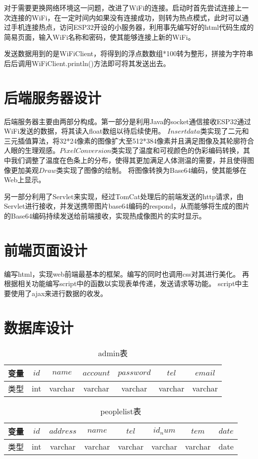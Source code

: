 对于需要更换网络环境这一问题，改进了WiFi的连接。启动时首先尝试连接上一次连接的WiFi，在一定时间内如果没有连接成功，则转为热点模式，此时可以通过手机连接热点，访问ESP32开设的小服务器，利用事先编写好的html代码生成的简易页面，输入WiFi名称和密码，使其能够连接上新的WiFi。

发送数据用到的是WiFiClient，将得到的浮点数数组*100转为整形，拼接为字符串后后调用WiFiClient.println()方法即可将其发送出去。
\section{后端服务器设计}
后端服务器主要由两部分构成。第一部分是利用Java的socket通信接收ESP32通过WiFi发送的数据，将其读入float数组以待后续使用。
$Insertdata$类实现了二元和三元插值算法，将32*24像素的图像扩大至512*384像素并且满足图像及其轮廓符合人眼的生理观感。$PixelConversion$类实现了温度和可视颜色的伪彩编码转换，其中我们调整了温度在色条上的分布，使得其更加满足人体测温的需要，并且使得图像更加美观$Draw$类实现了图像的绘制。
将图像转换为Base64编码，使其能够在Web上显示。

另一部分利用了Servlet来实现，经过TomCat处理后的前端发送的http请求，由Servlet进行接收，并发送携带图片base64编码的respond，从而能够将生成的图片的Base64编码持续发送给前端接收，实现热成像图片的实时显示。
\section{前端页面设计}
编写html，实现web前端最基本的框架。编写的同时也调用css对其进行美化。
再根据相关功能编写script中的函数以实现表单传递，发送请求等功能。
script中主要使用了ajax来进行数据的收发。
\section{数据库设计}
\begin{table}[htbp]
    \caption{admin表}\label{tab:table1}
    \vspace{0.5em}\centering\wuhao
    \begin{tabular}{ccccccc}
    \toprule[1.5pt]
    变量 & $id$ & $name$ & $account$&$password$ &$tel$&$email$\\
    \midrule[1pt]
    类型& int & varchar & varchar&varchar&varchar&varchar\\
    \bottomrule[1.5pt]
    \end{tabular}
    \vspace{\baselineskip}
    \end{table}
    
    \begin{table}[htbp]
        \caption{peoplelist表}\label{tab:table2}
        \vspace{0.5em}\centering\wuhao
        \begin{tabular}{cccccccc}
        \toprule[1.5pt]
        变量 & $id$&$address$ & $name$ & $tel$&$id_num$ &$tem$&$date$\\
        \midrule[1pt]
        类型& int & varchar & varchar&varchar&varchar&varchar&date\\
        \bottomrule[1.5pt]
        \end{tabular}
        \vspace{\baselineskip}
        \end{table}